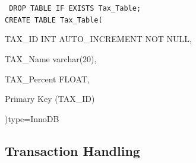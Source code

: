 \documentclass{report}
\begin{document}
        {\tt\small
        DROP TABLE IF EXISTS Tax\_Table;\\

        CREATE TABLE Tax\_Table(
        \begin{list}{}
            \item{TAX\_ID          INT AUTO\_INCREMENT NOT NULL,}
            \item{TAX\_Name        varchar(20),}
            \item{TAX\_Percent     FLOAT,}
            \item{Primary Key (TAX\_ID)}
        \end{list}
        )type=InnoDB\\
        }

        \subsection{Transaction Handling}
\end{document}
